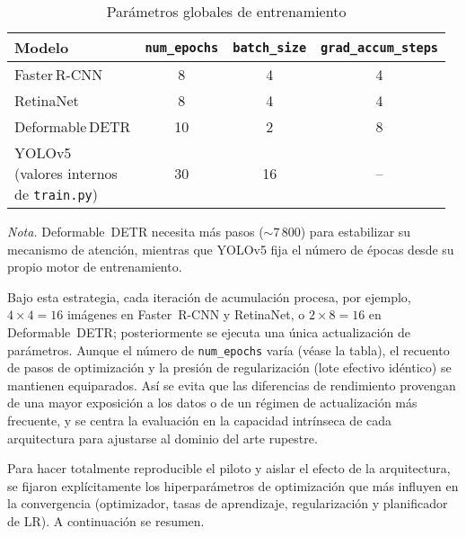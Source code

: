 \begin{table}[htbp]
\centering
\caption{Parámetros globales de entrenamiento}
\label{tab:train_summary}

\setlength{\tabcolsep}{5pt}
\begin{tabular}{p{4.2cm}ccc}
\hline
\textbf{Modelo} & \texttt{num\_epochs} & \texttt{batch\_size} & \texttt{grad\_accum\_steps}\\
\hline
Faster\,R-CNN         & 8  & 4  & 4  \\
RetinaNet             & 8  & 4  & 4  \\
Deformable\,DETR      & 10 & 2  & 8  \\
\shortstack{YOLOv5\\(valores internos\\de \texttt{train.py})} & 30 & 16 & -- \\
\hline
\end{tabular}
\end{table}

\noindent\small
\textit{Nota.} Deformable~DETR necesita más pasos (\(\sim 7\,800\)) para estabilizar su mecanismo de atención, mientras que YOLOv5 fija el número de épocas desde su propio motor de entrenamiento.

\noindent
Bajo esta estrategia, cada iteración de acumulación procesa, por ejemplo, \(4 \times 4 = 16\) imágenes en Faster~R-CNN y RetinaNet, o \(2 \times 8 = 16\) en Deformable~DETR; posteriormente se ejecuta una única actualización de parámetros.
Aunque el número de \texttt{num\_epochs} varía (véase la tabla), el recuento de pasos de optimización y la presión de regularización (lote efectivo idéntico) se mantienen equiparados.
Así se evita que las diferencias de rendimiento provengan de una mayor exposición a los datos o de un régimen de actualización más frecuente, y se centra la evaluación en la capacidad intrínseca de cada arquitectura para ajustarse al dominio del arte rupestre.

Para hacer totalmente reproducible el piloto y aislar el efecto de la arquitectura, se fijaron explícitamente los hiperparámetros de optimización que más influyen en la convergencia (optimizador, tasas de aprendizaje, regularización y planificador de LR).  A continuación se resumen.

